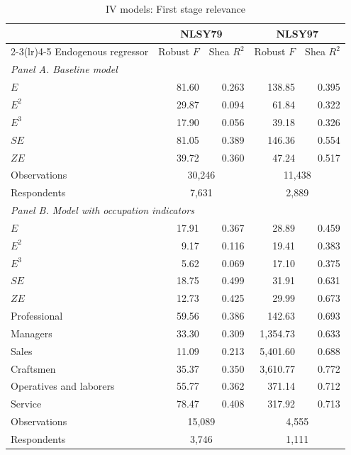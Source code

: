 \documentclass[11pt]{article}
\begin{document}
\begin{table}[p]\centering
\caption{IV models: First stage relevance}\label{tab:baseline_iv_firststage}
\begin{threeparttable}
\renewcommand{\baselinestretch}{1}\fontsize{10}{11.5}\selectfont
\begin{tabular*}{\textwidth}{@{\extracolsep{\fill}}lrrrr@{}}
\toprule
& \multicolumn{2}{c}{NLSY79} & \multicolumn{2}{c}{NLSY97} \\
\cmidrule(lr){2-3}\cmidrule(lr){4-5}
Endogenous regressor & Robust $F$ & Shea $R^2$ & Robust $F$ & Shea $R^2$ \\
\midrule
\multicolumn{5}{l}{\textit{Panel A. Baseline model}} \\
$E$ & 81.60 & 0.263 & 138.85 & 0.395 \\
$E^2$ & 29.87 & 0.094 & 61.84 & 0.322 \\
$E^3$ & 17.90 & 0.056 & 39.18 & 0.326 \\
$S E$ & 81.05 & 0.389 & 146.36 & 0.554 \\
$Z E$ & 39.72 & 0.360 & 47.24 & 0.517 \\
\addlinespace[3pt]
Observations & \multicolumn{2}{c}{30,246} & \multicolumn{2}{c}{11,438} \\
Respondents & \multicolumn{2}{c}{7,631} & \multicolumn{2}{c}{2,889} \\
\midrule
\multicolumn{5}{l}{\textit{Panel B. Model with occupation indicators}} \\
$E$ & 17.91 & 0.367 & 28.89 & 0.459 \\
$E^2$ & 9.17 & 0.116 & 19.41 & 0.383 \\
$E^3$ & 5.62 & 0.069 & 17.10 & 0.375 \\
$S E$ & 18.75 & 0.499 & 31.91 & 0.631 \\
$Z E$ & 12.73 & 0.425 & 29.99 & 0.673 \\
Professional & 59.56 & 0.386 & 142.63 & 0.693 \\
Managers & 33.30 & 0.309 & 1,354.73 & 0.633 \\
Sales & 11.09 & 0.213 & 5,401.60 & 0.688 \\
Craftsmen & 35.37 & 0.350 & 3,610.77 & 0.772 \\
Operatives and laborers & 55.77 & 0.362 & 371.14 & 0.712 \\
Service & 78.47 & 0.408 & 317.92 & 0.713 \\
\addlinespace[3pt]
Observations & \multicolumn{2}{c}{15,089} & \multicolumn{2}{c}{4,555} \\
Respondents & \multicolumn{2}{c}{3,746} & \multicolumn{2}{c}{1,111} \\

\end{tabular*}
\end{threeparttable}
\end{table}
\end{document}
